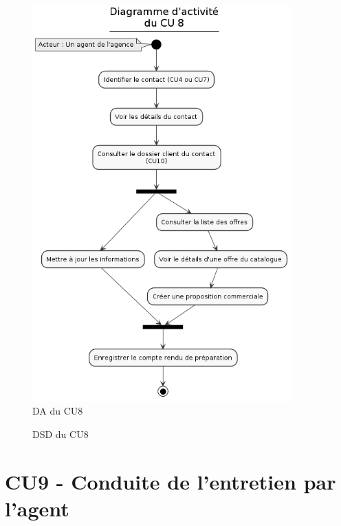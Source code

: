 \begin{figure}[h]
\centering
\includegraphics[width=10cm]{figures/DA_CU8.png}
\caption{DA du CU8}
\end{figure}

\begin{figure}[h]
\centering
\caption{DSD du CU8}
\end{figure}

\clearpage
\section{CU9 - Conduite de l’entretien par l’agent}

